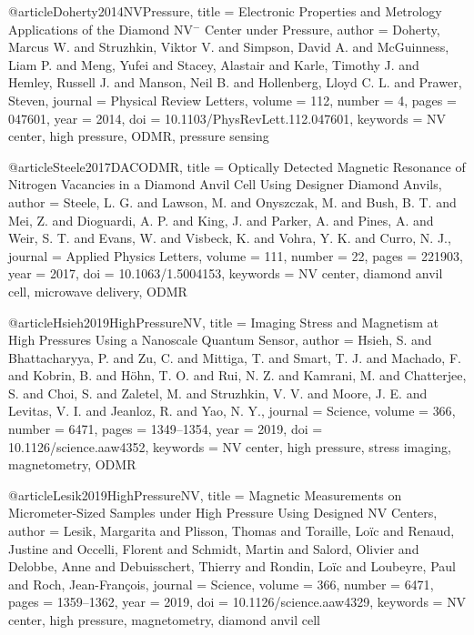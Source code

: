 
@article{Doherty2014NVPressure,
  title        = {Electronic Properties and Metrology Applications of the Diamond {NV$^-$} Center under Pressure},
  author       = {Doherty, Marcus W. and Struzhkin, Viktor V. and Simpson, David A. and McGuinness, Liam P. and Meng, Yufei and Stacey, Alastair and Karle, Timothy J. and Hemley, Russell J. and Manson, Neil B. and Hollenberg, Lloyd C. L. and Prawer, Steven},
  journal      = {Physical Review Letters},
  volume       = {112},
  number       = {4},
  pages        = {047601},
  year         = {2014},
  doi          = {10.1103/PhysRevLett.112.047601},
  keywords     = {NV center, high pressure, ODMR, pressure sensing}
}

@article{Steele2017DACODMR,
  title        = {Optically Detected Magnetic Resonance of Nitrogen Vacancies in a Diamond Anvil Cell Using Designer Diamond Anvils},
  author       = {Steele, L. G. and Lawson, M. and Onyszczak, M. and Bush, B. T. and Mei, Z. and Dioguardi, A. P. and King, J. and Parker, A. and Pines, A. and Weir, S. T. and Evans, W. and Visbeck, K. and Vohra, Y. K. and Curro, N. J.},
  journal      = {Applied Physics Letters},
  volume       = {111},
  number       = {22},
  pages        = {221903},
  year         = {2017},
  doi          = {10.1063/1.5004153},
  keywords     = {NV center, diamond anvil cell, microwave delivery, ODMR}
}

@article{Hsieh2019HighPressureNV,
  title        = {Imaging Stress and Magnetism at High Pressures Using a Nanoscale Quantum Sensor},
  author       = {Hsieh, S. and Bhattacharyya, P. and Zu, C. and Mittiga, T. and Smart, T. J. and Machado, F. and Kobrin, B. and H{\"o}hn, T. O. and Rui, N. Z. and Kamrani, M. and Chatterjee, S. and Choi, S. and Zaletel, M. and Struzhkin, V. V. and Moore, J. E. and Levitas, V. I. and Jeanloz, R. and Yao, N. Y.},
  journal      = {Science},
  volume       = {366},
  number       = {6471},
  pages        = {1349--1354},
  year         = {2019},
  doi          = {10.1126/science.aaw4352},
  keywords     = {NV center, high pressure, stress imaging, magnetometry, ODMR}
}

@article{Lesik2019HighPressureNV,
  title        = {Magnetic Measurements on Micrometer-Sized Samples under High Pressure Using Designed {NV} Centers},
  author       = {Lesik, Margarita and Plisson, Thomas and Toraille, Lo{\"i}c and Renaud, Justine and Occelli, Florent and Schmidt, Martin and Salord, Olivier and Delobbe, Anne and Debuisschert, Thierry and Rondin, Lo{\"i}c and Loubeyre, Paul and Roch, Jean-Fran{\c{c}}ois},
  journal      = {Science},
  volume       = {366},
  number       = {6471},
  pages        = {1359--1362},
  year         = {2019},
  doi          = {10.1126/science.aaw4329},
  keywords     = {NV center, high pressure, magnetometry, diamond anvil cell}
}

